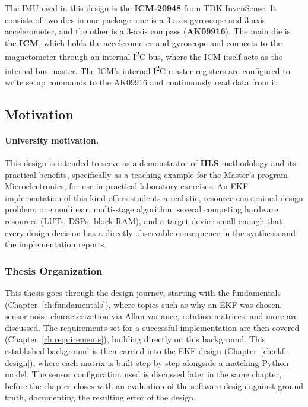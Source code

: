 \documentclass[12pt,a4paper]{article}
\begin{document}
The IMU used in this design is the \textbf{ICM-20948} from TDK
InvenSense. It consists of two dies in one package: one is a 3-axis
gyroscope and 3-axis accelerometer, and the other is a 3-axis
compass (\textbf{AK09916}). The main die is the \textbf{ICM}, which
holds the accelerometer and gyroscope and connects to the
magnetometer through an internal I\textsuperscript{2}C bus, where the
ICM itself acts as the internal bus master. The ICM's internal
I\textsuperscript{2}C master registers are configured to write setup
commands to the AK09916 and continuously read data from it.



\subsection{Motivation}
\label{sec:motivation}

\paragraph{University motivation.} This design is intended to serve
as a demonstrator of \textbf{HLS} methodology and its practical
benefits, specifically as a teaching example for the Master's
program Microelectronics, for use in practical laboratory
exercises. An EKF implementation of this kind offers students a
realistic, resource-constrained design problem: one nonlinear,
multi-stage algorithm, several competing hardware resources (LUTs,
DSPs, block RAM), and a target device small enough that every design
decision has a directly observable consequence in the synthesis and the implementation reports.

\subsubsection*{Thesis Organization}

This thesis goes through the design journey, starting with the
fundamentals (Chapter~\ref{ch:fundamentals}), where topics such as
why an EKF was chosen,
sensor noise characterization via Allan variance, rotation matrices,
and more are discussed. The requirements set for a successful
implementation are then covered (Chapter~\ref{ch:requirements}),
building directly on this background. This established background
is then carried into the EKF design (Chapter~\ref{ch:ekf-design}),
where each matrix is built step by step alongside a matching Python
model. The sensor configuration used is
discussed later in the same chapter, before the chapter closes
with an evaluation of the software design against ground truth,
documenting the resulting error of the design.
\end{document}
